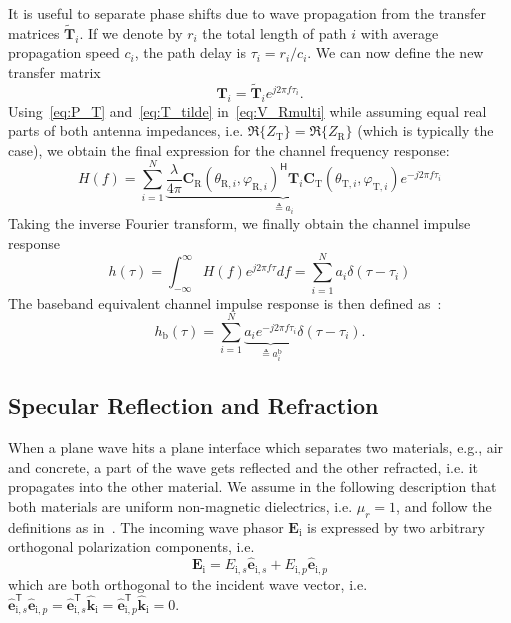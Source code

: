 It is useful to separate phase shifts due to wave propagation from the transfer matrices $\widetilde{\mathbf{T}}_i$.
If we denote by $r_i$ the total length of path $i$ with average propagation speed $c_i$, the path delay is $\tau_i=r_i/c_i$.
We can now define the new transfer matrix
\begin{equation}
    \label{eq:T_tilde}
    \mathbf{T}_i=\widetilde{\mathbf{T}}_ie^{j2\pi f \tau_i}.
\end{equation}
Using~\eqref{eq:P_T} and~\eqref{eq:T_tilde} in~\eqref{eq:V_Rmulti} while assuming equal real parts of both antenna impedances, i.e. $\Re\{Z_\text{T}\}=\Re\{Z_\text{R}\}$ (which is typically the case), we obtain the final expression for the channel frequency response:
\begin{equation}
    \label{eq:H_final}
    \boxed{H(f) = \sum_{i=1}^N \underbrace{\frac{\lambda}{4\pi} \mathbf{C}_\text{R}(\theta_{\text{R},i}, \varphi_{\text{R},i})^{\mathsf{H}}\mathbf{T}_i \mathbf{C}_\text{T}(\theta_{\text{T},i}, \varphi_{\text{T},i})}_{\triangleq a_i} e^{-j2\pi f\tau_i}}
\end{equation}
Taking the inverse Fourier transform, we finally obtain the channel impulse response
\begin{equation}
    \label{eq:h_final2}
    \boxed{h(\tau) = \int_{-\infty}^{\infty} H(f) e^{j2\pi f \tau} df = \sum_{i=1}^N a_i \delta(\tau-\tau_i)}
\end{equation}
The baseband equivalent channel impulse response is then defined as~\cite[Eq.~2.28]{Tse}:
\begin{equation}
    \label{eq:h_b}
    h_\text{b}(\tau) = \sum_{i=1}^N \underbrace{a_i e^{-j2\pi f \tau_i}}_{\triangleq a^\text{b}_i} \delta(\tau-\tau_i).
\end{equation}


\subsection{Specular Reflection and Refraction}
\label{sec:primer-em-spec-refrac}

When a plane wave hits a plane interface which separates two materials, e.g., air and concrete, a part of the wave gets reflected and the other refracted, i.e. it propagates into the other material. We assume in the following description that both materials are uniform non-magnetic dielectrics, i.e. $\mu_r=1$, and follow the definitions as in~\cite{ITU_R_P2040}. The incoming wave phasor $\mathbf{E}_\text{i}$ is expressed by two arbitrary orthogonal polarization components, i.e.
\begin{equation}
    \mathbf{E}_\text{i} = E_{\text{i},s} \hat{\mathbf{e}}_{\text{i},s} + E_{\text{i},p} \hat{\mathbf{e}}_{\text{i},p}
\end{equation}
which are both orthogonal to the incident wave vector, i.e. $\hat{\mathbf{e}}_{\text{i},s}^{\mathsf{T}} \hat{\mathbf{e}}_{\text{i},p}=\hat{\mathbf{e}}_{\text{i},s}^{\mathsf{T}} \hat{\mathbf{k}}_\text{i}=\hat{\mathbf{e}}_{\text{i},p}^{\mathsf{T}} \hat{\mathbf{k}}_\text{i} =0$.


